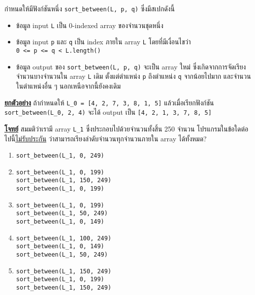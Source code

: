 \question{\label{q:quickfire_central_audition_sortbetweenintro}}

กำหนดให้มีฟังก์ชันหนึ่ง \lstinline{sort_between(L, p, q)}    ซึ่งมีสเปกดังนี้ 
\begin{itemize}
    \item ข้อมูล input \lstinline{L} เป็น 0-indexed array ของจำนวนชุดหนึ่ง
    \item ข้อมูล input \lstinline{p} และ \lstinline{q} เป็น index 
        ภายใน array \lstinline{L} โดยที่มีเงื่อนไขว่า \\
        \lstinline{0 <= p <= q < L.length()}
    \item ข้อมูล output ของ \lstinline{sort_between(L, p, q)} 
        จะเป็น array ใหม่ ซึ่งเกิดจากการจัดเรียงจำนวนบางจำนวนใน array \lstinline{L} เดิม 
        ตั้งแต่ตำแหน่ง \lstinline{p} ถึงตำแหน่ง \lstinline{q} จากน้อยไปมาก
        และจำนวนในตำแหน่งอื่น ๆ นอกเหนือจากนี้ยังคงเดิม
\end{itemize}

\noindent
\textbf{\uline{ยกตัวอย่าง}}\; ถ้ากำหนดให้ \lstinline{L_0 = [4, 2, 7, 3, 8, 1, 5]}
แล้วเมื่อเรียกฟังก์ชัน \lstinline{sort_between(L_0, 2, 4)}  
จะได้ output เป็น \lstinline{[4, 2, 1, 3, 7, 8, 5]}

\medskip\noindent
\textbf{\uline{โจทย์}}\; สมมติว่าเรามี array \lstinline{L_1} 
ซึ่งประกอบไปด้วยจำนวนทั้งสิ้น 250 จำนวน โปรแกรมในข้อใดต่อไปนี้\hrsp\uline{ไม่รับประกัน}\hrsp%
ว่าสามารถเรียงลำดับจำนวนทุกจำนวนภายใน array ได้ทั้งหมด?
\begin{enumerate}[label={$\Circle$}]
\item \lstinline{sort_between(L_1, 0, 249)}
\item
    \lstinline{sort_between(L_1, 0, 199)} \\
    \lstinline{sort_between(L_1, 150, 249)} \\
    \lstinline{sort_between(L_1, 0, 199)}
\item 
    \lstinline{sort_between(L_1, 0, 199)} \\
    \lstinline{sort_between(L_1, 50, 249)} \\
    \lstinline{sort_between(L_1, 0, 149)}
\item 
    \lstinline{sort_between(L_1, 100, 249)} \\
    \lstinline{sort_between(L_1, 0, 149)} \\
    \lstinline{sort_between(L_1, 50, 249)}
\item 
    \lstinline{sort_between(L_1, 150, 249)} \\
    \lstinline{sort_between(L_1, 0, 199)} \\
    \lstinline{sort_between(L_1, 150, 249)}
\end{enumerate}
